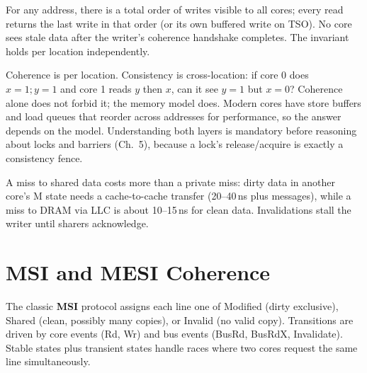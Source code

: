 \begin{definition}
For any address, there is a total order of writes visible to all cores; every read returns the last write in that order (or its own buffered write on TSO). No core sees stale data after the writer's coherence handshake completes. The invariant holds per location independently.
\end{definition}

Coherence is per location. Consistency is cross-location: if core 0 does $x=1;y=1$ and core 1 reads $y$ then $x$, can it see $y=1$ but $x=0$? Coherence alone does not forbid it; the memory model does. Modern cores have store buffers and load queues that reorder across addresses for performance, so the answer depends on the model. Understanding both layers is mandatory before reasoning about locks and barriers (Ch.~5), because a lock's release/acquire is exactly a consistency fence.

A miss to shared data costs more than a private miss: dirty data in another core's M state needs a cache-to-cache transfer (20--40\,ns plus messages), while a miss to DRAM via LLC is about 10--15\,ns for clean data. Invalidations stall the writer until sharers acknowledge.

\section{MSI and MESI Coherence}\label{sec:mesi}
The classic \textbf{MSI} protocol assigns each line one of Modified (dirty exclusive), Shared (clean, possibly many copies), or Invalid (no valid copy). Transitions are driven by core events (Rd, Wr) and bus events (BusRd, BusRdX, Invalidate). Stable states plus transient states handle races where two cores request the same line simultaneously.


